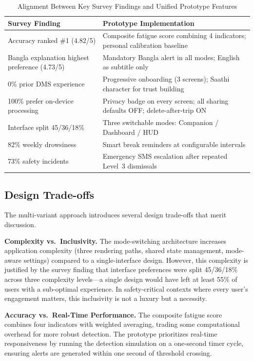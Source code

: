 \documentclass[sigconf]{acmart}
\begin{document}
\begin{table}[H]
\centering
\caption{Alignment Between Key Survey Findings and Unified Prototype Features}
\label{tab:req_alignment_final}
\small
\begin{tabular}{|p{3.2cm}|p{4.3cm}|}
\hline
\textbf{Survey Finding} & \textbf{Prototype Implementation} \\
\hline
Accuracy ranked \#1 (4.82/5) & Composite fatigue score combining 4 indicators; personal calibration baseline \\
\hline
Bangla explanation highest preference (4.73/5) & Mandatory Bangla alert in all modes; English as subtitle only \\
\hline
0\% prior DMS experience & Progressive onboarding (3 screens); Saathi character for trust building \\
\hline
100\% prefer on-device processing & Privacy badge on every screen; all sharing defaults OFF; delete-after-trip ON \\
\hline
Interface split 45/36/18\% & Three switchable modes: Companion / Dashboard / HUD \\
\hline
82\% weekly drowsiness & Smart break reminders at configurable intervals \\
\hline
73\% safety incidents & Emergency SMS escalation after repeated Level~3 dismissals \\
\hline
\end{tabular}
\end{table}

\subsection{Design Trade-offs}

The multi-variant approach introduces several design trade-offs that merit discussion.

\textbf{Complexity vs.\ Inclusivity.} The mode-switching architecture increases application complexity (three rendering paths, shared state management, mode-aware settings) compared to a single-interface design. However, this complexity is justified by the survey finding that interface preferences were split 45/36/18\% across three complexity levels---a single design would have left at least 55\% of users with a sub-optimal experience. In safety-critical contexts where every user's engagement matters, this inclusivity is not a luxury but a necessity.

\textbf{Accuracy vs.\ Real-Time Performance.} The composite fatigue score combines four indicators with weighted averaging, trading some computational overhead for more robust detection. The prototype prioritizes real-time responsiveness by running the detection simulation on a one-second timer cycle, ensuring alerts are generated within one second of threshold crossing.
\end{document}
